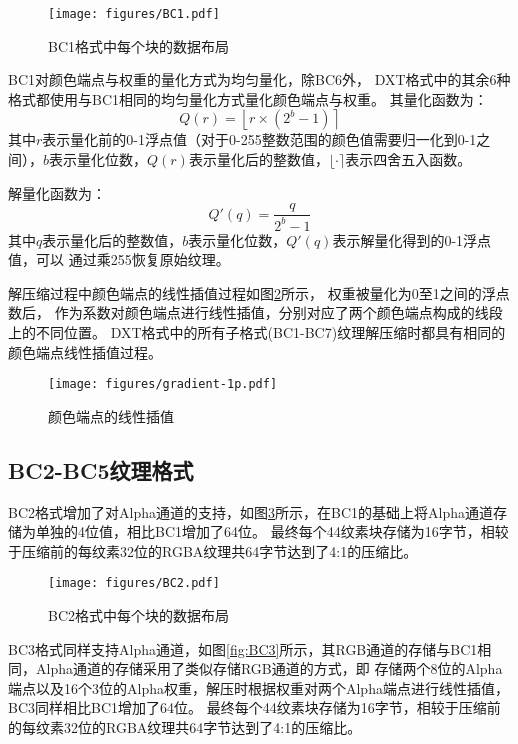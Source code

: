 \begin{figure}[htbp]
    \centering
    \texttt{[image: figures/BC1.pdf]}
    \caption{BC1格式中每个块的数据布局\cite{BC1-5}}
    \label{fig:BC1}
\end{figure}

BC1对颜色端点与权重的量化方式为均匀量化，除BC6外，
DXT格式中的其余6种格式都使用与BC1相同的均匀量化方式量化颜色端点与权重。
其量化函数为：
\begin{equation}\label{eqn-6}
    Q(r)=\left \lfloor r \times (2^{b}-1) \right \rceil
\end{equation}
其中$r$表示量化前的0-1浮点值（对于0-255整数范围的颜色值需要归一化到0-1之间），$b$表示量化位数，$Q(r)$表示量化后的整数值，$\lfloor \cdot \rceil$表示四舍五入函数。

解量化函数为：
\begin{equation}\label{eqn-6}
    Q'(q)=\frac{q}{2^{b}-1}
\end{equation}
其中$q$表示量化后的整数值，$b$表示量化位数，$Q'(q)$表示解量化得到的0-1浮点值，可以
通过乘255恢复原始纹理。

解压缩过程中颜色端点的线性插值过程如图\ref{fig:LinearInterpolate}所示，
权重被量化为0至1之间的浮点数后，
作为系数对颜色端点进行线性插值，分别对应了两个颜色端点构成的线段上的不同位置。
DXT格式中的所有子格式(BC1-BC7)纹理解压缩时都具有相同的颜色端点线性插值过程。

\begin{figure}[htbp]
    \centering
    \texttt{[image: figures/gradient-1p.pdf]}
    \caption{颜色端点的线性插值\cite{ASTC}}
    \label{fig:LinearInterpolate}
\end{figure}

\subsection{BC2-BC5纹理格式}
BC2格式增加了对Alpha通道的支持，如图\ref{fig:BC2}所示，在BC1的基础上将Alpha通道存储为单独的4位值，相比BC1增加了64位。
最终每个4\times4纹素块存储为16字节，相较于压缩前的每纹素32位的RGBA纹理共64字节达到了4:1的压缩比。

\begin{figure}[htbp]
    \centering
    \texttt{[image: figures/BC2.pdf]}
    \caption{BC2格式中每个块的数据布局\cite{BC1-5}}
    \label{fig:BC2}
\end{figure}    

BC3格式同样支持Alpha通道，如图\ref{fig:BC3}所示，其RGB通道的存储与BC1相同，Alpha通道的存储采用了类似存储RGB通道的方式，即
存储两个8位的Alpha 端点以及16个3位的Alpha权重，解压时根据权重对两个Alpha端点进行线性插值，BC3同样相比BC1增加了64位。
最终每个4\times4纹素块存储为16字节，相较于压缩前的每纹素32位的RGBA纹理共64字节达到了4:1的压缩比。

